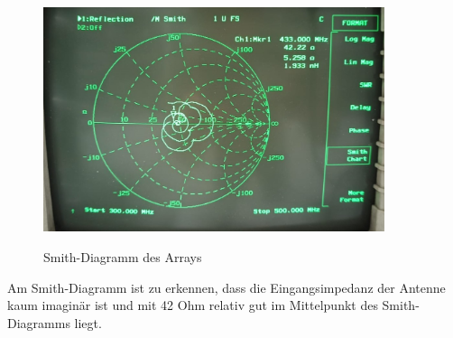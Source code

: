 \begin{figure}[H]
	\centering
	\includegraphics[width=10cm]{../ref/Array-Smith.jpg}
	\label{fig:array-Smith}
	\caption{Smith-Diagramm des Arrays}
\end{figure}

Am Smith-Diagramm ist zu erkennen, dass die Eingangsimpedanz der Antenne kaum imaginär ist und mit 42 Ohm relativ gut im Mittelpunkt des Smith-Diagramms liegt.
